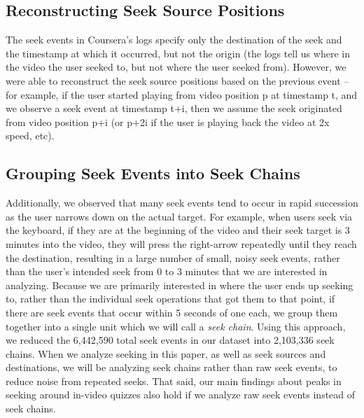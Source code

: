 \documentclass{sigchi}
\begin{document}
\subsection{Reconstructing Seek Source Positions}

The seek events in Coursera's logs specify only the destination of the seek and the timestamp at which it occurred, but not the origin (the logs tell us where in the video the user seeked to, but not where the user seeked from). However, we were able to reconstruct the seek source positions based on the previous event -- for example, if the user started playing from video position p at timestamp t, and we observe a seek event at timestamp t+i, then we assume the seek originated from video position p+i (or p+2i if the user is playing back the video at 2x speed, etc).

\subsection{Grouping Seek Events into Seek Chains}

Additionally, we observed that many seek events tend to occur in rapid succession as the user narrows down on the actual target. For example, when users seek via the keyboard, if they are at the beginning of the video and their seek target is 3 minutes into the video, they will press the right-arrow repeatedly until they reach the destination, resulting in a large number of small, noisy seek events, rather than the user's intended seek from 0 to 3 minutes that we are interested in analyzing. Because we are primarily interested in where the user ends up seeking to, rather than the individual seek operations that got them to that point, if there are seek events that occur within 5 seconds of one each, we group them together into a single unit which we will call a \textit{seek chain}. Using this approach, we reduced the 6,442,590 total seek events in our dataset into 2,103,336 seek chains. When we analyze seeking in this paper, as well as seek sources and destinations, we will be analyzing seek chains rather than raw seek events, to reduce noise from repeated seeks. That said, our main findings about peaks in seeking around in-video quizzes also hold if we analyze raw seek events instead of seek chains.

\end{document}
